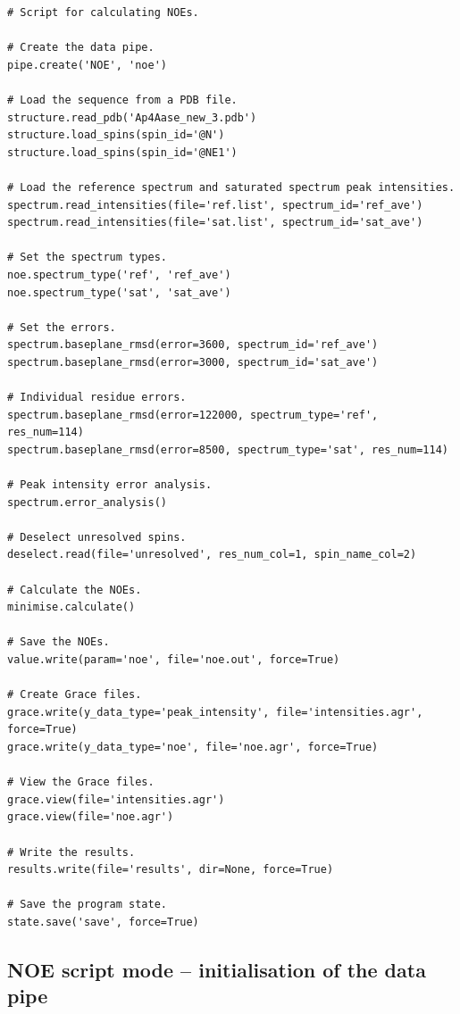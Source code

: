 \begin{lstlisting}
# Script for calculating NOEs.

# Create the data pipe.
pipe.create('NOE', 'noe')

# Load the sequence from a PDB file.
structure.read_pdb('Ap4Aase_new_3.pdb')
structure.load_spins(spin_id='@N')
structure.load_spins(spin_id='@NE1')

# Load the reference spectrum and saturated spectrum peak intensities.
spectrum.read_intensities(file='ref.list', spectrum_id='ref_ave')
spectrum.read_intensities(file='sat.list', spectrum_id='sat_ave')

# Set the spectrum types.
noe.spectrum_type('ref', 'ref_ave')
noe.spectrum_type('sat', 'sat_ave')

# Set the errors.
spectrum.baseplane_rmsd(error=3600, spectrum_id='ref_ave')
spectrum.baseplane_rmsd(error=3000, spectrum_id='sat_ave')

# Individual residue errors.
spectrum.baseplane_rmsd(error=122000, spectrum_type='ref', res_num=114)
spectrum.baseplane_rmsd(error=8500, spectrum_type='sat', res_num=114)

# Peak intensity error analysis.
spectrum.error_analysis()

# Deselect unresolved spins.
deselect.read(file='unresolved', res_num_col=1, spin_name_col=2)

# Calculate the NOEs.
minimise.calculate()

# Save the NOEs.
value.write(param='noe', file='noe.out', force=True)

# Create Grace files.
grace.write(y_data_type='peak_intensity', file='intensities.agr', force=True)
grace.write(y_data_type='noe', file='noe.agr', force=True)

# View the Grace files.
grace.view(file='intensities.agr')
grace.view(file='noe.agr')

# Write the results.
results.write(file='results', dir=None, force=True)

# Save the program state.
state.save('save', force=True)
\end{lstlisting}




\subsection{NOE script mode -- initialisation of the data pipe} \label{NOE initialisation}

